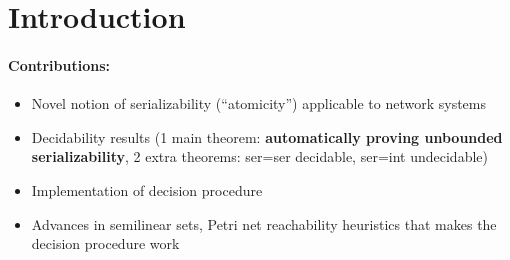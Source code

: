\section{Introduction}
\label{sec:introduction}






\paragraph{Contributions:}
\begin{itemize}
    \item Novel notion of serializability (``atomicity'') applicable to network systems
    \item Decidability results (1 main theorem: \textbf{automatically proving unbounded serializability}, 2 extra theorems: ser=ser decidable, ser=int undecidable)
    \item Implementation of decision procedure
    \item Advances in semilinear sets, Petri net reachability heuristics that makes the decision procedure work
\end{itemize}